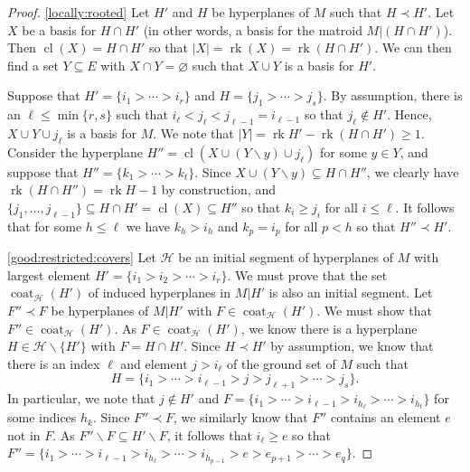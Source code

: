 \documentclass[11pt, reqno]{amsart}
\newcommand{\abs}[1]{\left\vert #1 \right\vert}
\DeclareMathOperator{\cl}{cl}
\DeclareMathOperator{\coat}{coat}
\renewcommand{\emptyset}{\varnothing}
\DeclareMathOperator{\rk}{rk}
\renewcommand{\setminus}{\smallsetminus}
\theoremstyle{definition}
\numberwithin{equation}{section}
\numberwithin{table}{section}
\begin{document}
\begin{spacing}{1.1}
\begin{proof}
\ref{locally:rooted} Let $H'$ and $H$ be hyperplanes of $M$ such that $H \prec H'$.  Let $X$ be a basis for $H \cap H'$ (in other words, a basis for the matroid $M\vert(H \cap H')$).  Then $\cl(X) = H \cap H'$ so that $\abs{X} = \rk(X) = \rk(H \cap H')$.  We can then find a set $Y \subseteq E$ with $X \cap Y = \emptyset$ such that $X \cup Y$ is a basis for $H'$. 

Suppose that  $H' = \{i_1 > \cdots > i_r\}$ and $H = \{j_1 > \cdots > j_s\}$.  By assumption, there is an $\ell \leq \min\{r, s\}$ such that $i_\ell < j_\ell < j_{\ell - 1} = i_{\ell -1}$ so that $j_\ell \notin H'$.  Hence, $X \cup Y \cup j_\ell$ is a basis for $M$.  We note that $\abs{Y} = \rk H' - \rk(H \cap H') \geq 1$.  Consider the hyperplane $H'' = \cl(X \cup (Y \setminus y) \cup j_\ell)$ for some $y \in Y$, and suppose that $H'' = \{k_1> \cdots > k_t\}$.  Since $X \cup (Y \setminus y) \subseteq H \cap H''$, we clearly have $\rk(H \cap H'') = \rk H - 1$ by construction, and $\{j_1, \dots, j_{\ell - 1}\} \subseteq H \cap H' = \cl(X) \subseteq H''$ so that $k_i \geq j_i$ for all $i \leq \ell$.  It follows that for some $h \leq \ell$ we have $k_h > i_h$ and $k_p = i_p$ for all $p < h$ so that $H'' \prec H'$.

\ref{good:restricted:covers} Let $\mathcal{H}$ be an initial segment of hyperplanes of $M$ with largest element $H' = \{i_1 > i_2 > \cdots > i_r\}$.  We must prove that the set $\coat_\mathcal{H}(H')$ of induced hyperplanes in $M\vert H'$ is also an initial segment.  Let $F'' \prec F$ be hyperplanes of $M\vert H'$ with $F \in \coat_\mathcal{H}(H')$.  We must show that $F'' \in \coat_\mathcal{H}(H')$.  As $F \in \coat_\mathcal{H}(H')$, we know there is a hyperplane $H \in \mathcal{H} \setminus \{H'\}$ with $F = H \cap H'$.    Since $H \prec H'$ by assumption, we know that there is an index $\ell$ and element $j > i_\ell$ of the ground set of $M$ such that 
\[ 
H = \{i_1 > \cdots > i_{\ell - 1} > j > j_{\ell + 1} > \cdots > j_s \}.
\]  
In particular, we note that $j \notin H'$ and $F = \{i_1 > \cdots > i_{\ell -1} > i_{h_\ell} > \cdots > i_{h_t} \}$ for some indices $h_k$.  Since $F'' \prec F$, we similarly know that $F''$ contains an element $e$ not in $F$.  As $F'' \setminus F \subseteq H' \setminus F$, it follows that $i_\ell \geq e$ so that $F'' = \{ i_1 > \cdots > i_{\ell -1} > i_{h_\ell} > \cdots > i_{h_{p-1}} > e > e_{p+1} > \cdots > e_q \}$.


\end{proof}
\end{spacing}
\end{document}
